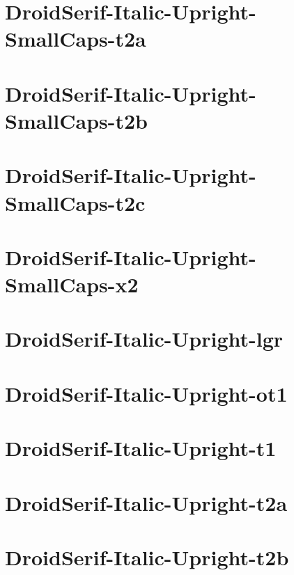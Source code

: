 \documentclass{article}
\begin{document}
\section{DroidSerif-Italic-Upright-SmallCaps-t2a}

\section{DroidSerif-Italic-Upright-SmallCaps-t2b}

\section{DroidSerif-Italic-Upright-SmallCaps-t2c}

\section{DroidSerif-Italic-Upright-SmallCaps-x2}

\section{DroidSerif-Italic-Upright-lgr}

\section{DroidSerif-Italic-Upright-ot1}

\section{DroidSerif-Italic-Upright-t1}

\section{DroidSerif-Italic-Upright-t2a}

\section{DroidSerif-Italic-Upright-t2b}
\end{document}
